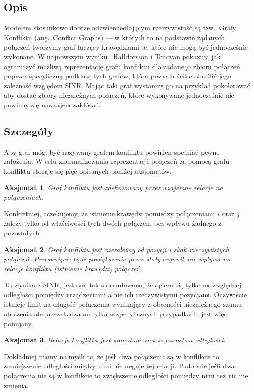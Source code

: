 \documentclass[11pt,a4paper,onecolumn,twoside]{mwart}
\newtheorem{axiom}{Aksjomat}
\begin{document}
\subsection{Opis}
Modelem stosunkowo dobrze odzwierciedlającym rzeczywistość są tzw.\ Grafy
Konfliktu (ang.\ Conflict Graphs) --- w których to na podstawie żądanych
połączeń tworzymy graf łączący krawędziami te, które nie mogą być jednocześnie
wykonane. W najnowszym wyniku~\cite{Halldorsson:2015:WGR:2746539.2746585}
Halldorsson i Tonoyan pokazują jak ograniczyć możliwą reprezentację grafu
konfliktu dla zadanego zbioru połączeń poprzez specyficzną podklasę tych grafów,
która pozwala ściśle określić jego zależność względem SINR\@.
Mając taki graf wystarczy go na przykład pokolorować aby dostać zbiory
niezależnych połączeń, które wykonywane jednocześnie nie powinny się nawzajem
zakłócać.

\subsection{Szczegóły}
Aby graf mógł być nazywany grafem konfliktu powinien spełniać pewne założenia.
W celu znormalizowania reprezentacji połączeń za pomocą grafu konfliktu stosuje
się pięć opisanych poniżej aksjomatów.

\begin{axiom}
    Graf konfliktu jest zdefiniowany przez wzajemne relacje na połączeniach.
\end{axiom}
Konkretniej, oczekujemy, że istnienie krawędzi pomiędzy połączeniami $i$
oraz $j$ zależy tylko od właściwości tych dwóch połączeń, bez wpływu żadnego
z pozostałych.

\begin{axiom}
    Graf konfliktu jest niezależny od pozycji i skali rzeczywistych połączeń.
    Przesunięcie bądź powiększenie przez stały czynnik nie wpływa na relacje
    konfliktu (istnienie krawędzi) połączeń.
\end{axiom}
To wynika z SINR, jest ona tak sformułowana, że opiera się tylko na względnej
odległości pomiędzy urządzeniami a nie ich rzeczywistymi pozycjami. Oczywiście
istnieje limit na długość połączenia wynikający z obecności niezależnego szumu
otoczenia ale przeszkadza on tylko w specyficznych przypadkach, jest więc
pomijany.

\begin{axiom}
    Relacja konfliktu jest monotoniczna ze wzrostem odległości.
\end{axiom}
Dokładniej mamy na myśli to, że jeśli dwa połączenia są w konflikcie
to zmniejszenie odległości między nimi nie neguje tej relacji. Podobnie jeśli
dwa połączenia nie są w konflikcie to zwiększenie odległości pomiędzy nimi
też nic nie zmienia.
\end{document}
